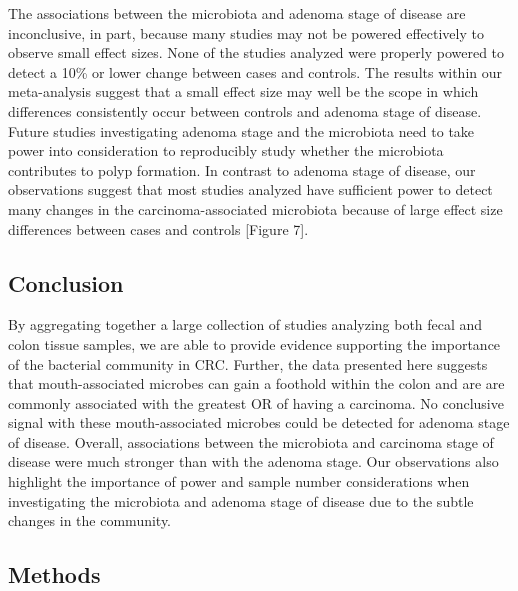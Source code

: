\documentclass[12pt,]{article}
\begin{document}
The associations between the microbiota and adenoma stage of disease are
inconclusive, in part, because many studies may not be powered
effectively to observe small effect sizes. None of the studies analyzed
were properly powered to detect a 10\% or lower change between cases and
controls. The results within our meta-analysis suggest that a small
effect size may well be the scope in which differences consistently
occur between controls and adenoma stage of disease. Future studies
investigating adenoma stage and the microbiota need to take power into
consideration to reproducibly study whether the microbiota contributes
to polyp formation. In contrast to adenoma stage of disease, our
observations suggest that most studies analyzed have sufficient power to
detect many changes in the carcinoma-associated microbiota because of
large effect size differences between cases and controls {[}Figure 7{]}.

\newpage

\subsection{Conclusion}\label{conclusion}

By aggregating together a large collection of studies analyzing both
fecal and colon tissue samples, we are able to provide evidence
supporting the importance of the bacterial community in CRC. Further,
the data presented here suggests that mouth-associated microbes can gain
a foothold within the colon and are are commonly associated with the
greatest OR of having a carcinoma. No conclusive signal with these
mouth-associated microbes could be detected for adenoma stage of
disease. Overall, associations between the microbiota and carcinoma
stage of disease were much stronger than with the adenoma stage. Our
observations also highlight the importance of power and sample number
considerations when investigating the microbiota and adenoma stage of
disease due to the subtle changes in the community.

\newpage

\subsection{Methods}\label{methods}
\end{document}
